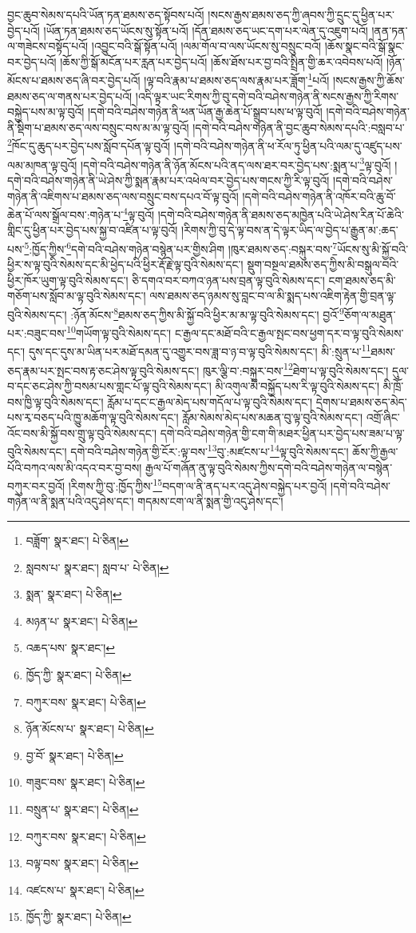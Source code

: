 བྱང་ཆུབ་སེམས་དཔའི་ཡོན་ཏན་ཐམས་ཅད་སྟོབས་པའོ། །སངས་རྒྱས་ཐམས་ཅད་ཀྱི་ཞབས་ཀྱི་དྲུང་དུ་ཕྱིན་པར་བྱེད་པའོ། །ཡོན་ཏན་ཐམས་ཅད་ཡོངས་སུ་སྟོན་པའོ། །དོན་ཐམས་ཅད་ཡང་དག་པར་ལེན་དུ་འཇུག་པའོ། །ནན་ཏན་ལ་གཟེངས་བསྟོད་པའོ། །འབྱུང་བའི་སྒོ་སྟོན་པའོ། །ལམ་གོལ་བ་ལས་ཡོངས་སུ་བསྲུང་བའོ། །ཆོས་སྣང་བའི་སྒོ་སྣང་བར་བྱེད་པའོ། །ཆོས་ཀྱི་སྒོ་མངོན་པར་རླན་པར་བྱེད་པའོ། །ཆོས་ཐོས་པར་བྱ་བའི་སྤྲིན་གྱི་ཆར་འབེབས་པའོ། །ཉོན་མོངས་པ་ཐམས་ཅད་ཞི་བར་བྱེད་པའོ། །ལྟ་བའི་རྣམ་པ་ཐམས་ཅད་ལས་རྣམ་པར་ཟློག་\footnote{བཟློག་  སྣར་ཐང་།  པེ་ཅིན། }པའོ། །སངས་རྒྱས་ཀྱི་ཆོས་ཐམས་ཅད་ལ་གནས་པར་བྱེད་པའོ། །འདི་ལྟར་ཡང་རིགས་ཀྱི་བུ་དགེ་བའི་བཤེས་གཉེན་ནི་སངས་རྒྱས་ཀྱི་རིགས་བསྐྱེད་པས་མ་ལྟ་བུའོ། །དགེ་བའི་བཤེས་གཉེན་ནི་ཕན་ཡོན་རྒྱ་ཆེན་པོ་སྒྲུབ་པས་ཕ་ལྟ་བུའོ། །དགེ་བའི་བཤེས་གཉེན་ནི་སྡིག་པ་ཐམས་ཅད་ལས་བསྲུང་བས་མ་མ་ལྟ་བུའོ། །དགེ་བའི་བཤེས་གཉེན་ནི་བྱང་ཆུབ་སེམས་དཔའི་:བསླབ་པ་\footnote{སླབས་པ་  སྣར་ཐང་། སླབ་པ་  པེ་ཅིན། }ཁོང་དུ་ཆུད་པར་བྱེད་པས་སློབ་དཔོན་ལྟ་བུའོ། །དགེ་བའི་བཤེས་གཉེན་ནི་ཕ་རོལ་ཏུ་ཕྱིན་པའི་ལམ་དུ་འཛུད་པས་ལམ་མཁན་ལྟ་བུའོ། །དགེ་བའི་བཤེས་གཉེན་ནི་ཉོན་མོངས་པའི་ནད་ལས་ཐར་བར་བྱེད་པས་:སྨན་པ་\footnote{སྨན་  སྣར་ཐང་།  པེ་ཅིན། }ལྟ་བུའོ། །དགེ་བའི་བཤེས་གཉེན་ནི་ཡེ་ཤེས་ཀྱི་སྨན་རྣམ་པར་འཕེལ་བར་བྱེད་པས་གངས་ཀྱི་རི་ལྟ་བུའོ། །དགེ་བའི་བཤེས་གཉེན་ནི་འཇིགས་པ་ཐམས་ཅད་ལས་བསྲུང་བས་དཔའ་བོ་ལྟ་བུའོ། །དགེ་བའི་བཤེས་གཉེན་ནི་འཁོར་བའི་ཆུ་བོ་ཆེན་པོ་ལས་སྒྲོལ་བས་:གཉེན་པ་\footnote{མཉན་པ་  སྣར་ཐང་།  པེ་ཅིན། }ལྟ་བུའོ། །དགེ་བའི་བཤེས་གཉེན་ནི་ཐམས་ཅད་མཁྱེན་པའི་ཡེ་ཤེས་རིན་པོ་ཆེའི་གླིང་དུ་ཕྱིན་པར་བྱེད་པས་སྐྱ་བ་འཛིན་པ་ལྟ་བུའོ། །རིགས་ཀྱི་བུ་དེ་ལྟ་བས་ན་དེ་ལྟར་ཡིད་ལ་བྱེད་པ་རྒྱུན་མ་:ཆད་པས་\footnote{འཆད་པས་  སྣར་ཐང་། }:ཁྱོད་ཀྱིས་\footnote{ཁྱོད་ཀྱི་  སྣར་ཐང་།  པེ་ཅིན། }དགེ་བའི་བཤེས་གཉེན་བསྙེན་པར་གྱིས་ཤིག །ཁུར་ཐམས་ཅད་:བསྐུར་བས་\footnote{བཀུར་བས་  སྣར་ཐང་།  པེ་ཅིན། }ཡོངས་སུ་མི་སྐྱོ་བའི་ཕྱིར་ས་ལྟ་བུའི་སེམས་དང་མི་ཕྱེད་པའི་ཕྱིར་རྡོ་རྗེ་ལྟ་བུའི་སེམས་དང་། སྡུག་བསྔལ་ཐམས་ཅད་ཀྱིས་མི་བསྒུལ་བའི་ཕྱིར་ཁོར་ཡུག་ལྟ་བུའི་སེམས་དང་། ཅི་དགའ་བར་བཀའ་ཉན་པས་བྲན་ལྟ་བུའི་སེམས་དང་། ངག་ཐམས་ཅད་མི་གཅོག་པས་སློབ་མ་ལྟ་བུའི་སེམས་དང་། ལས་ཐམས་ཅད་ཉམས་སུ་བླང་བ་ལ་མི་སྨད་པས་འཇིག་རྟེན་གྱི་བྲན་ལྟ་བུའི་སེམས་དང་། :ཉོན་མོངས་\footnote{ཉོན་མོངས་པ་  སྣར་ཐང་།  པེ་ཅིན། }ཐམས་ཅད་ཀྱིས་མི་སྐྱོ་བའི་ཕྱིར་མ་མ་ལྟ་བུའི་སེམས་དང་། བྱའོ་\footnote{བྱ་བོ་  སྣར་ཐང་།  པེ་ཅིན། }ཅོག་ལ་མཐུན་པར་:བཟུང་བས་\footnote{གཟུང་བས་  སྣར་ཐང་།  པེ་ཅིན། }གཡོག་ལྟ་བུའི་སེམས་དང་། ང་རྒྱལ་དང་མཐོ་བའི་ང་རྒྱལ་སྤང་བས་ཕྱག་དར་བ་ལྟ་བུའི་སེམས་དང་། དུས་དང་དུས་མ་ཡིན་པར་མཐོ་དམན་དུ་འགྱུར་བས་ཟླ་བ་ཉ་བ་ལྟ་བུའི་སེམས་དང་། མི་:སྲུན་པ་\footnote{བསྲུན་པ་  སྣར་ཐང་།  པེ་ཅིན། }ཐམས་ཅད་རྣམ་པར་སྤང་བས་རྟ་ཅང་ཤེས་ལྟ་བུའི་སེམས་དང་། ཁུར་ལྕི་བ་:བསྐུར་བས་\footnote{བཀུར་བས་  སྣར་ཐང་།  པེ་ཅིན། }ཐེག་པ་ལྟ་བུའི་སེམས་དང་། དུལ་བ་དང་ཅང་ཤེས་ཀྱི་བསམ་པས་གླང་པོ་ལྟ་བུའི་སེམས་དང་། མི་འགུལ་མི་བསྐྱོད་པས་རི་ལྟ་བུའི་སེམས་དང་། མི་ཁྲོ་བས་ཁྱི་ལྟ་བུའི་སེམས་དང་། རློམ་པ་དང་ང་རྒྱལ་མེད་པས་གདོལ་པ་ལྟ་བུའི་སེམས་དང་། དྲེགས་པ་ཐམས་ཅད་མེད་པས་རྭ་བཅད་པའི་ཁྱུ་མཆོག་ལྟ་བུའི་སེམས་དང་། རློམ་སེམས་མེད་པས་མཆན་བུ་ལྟ་བུའི་སེམས་དང་། འགྲོ་ཞིང་འོང་བས་མི་སྐྱོ་བས་གྲུ་ལྟ་བུའི་སེམས་དང་། དགེ་བའི་བཤེས་གཉེན་གྱི་ངག་གི་མཐར་ཕྱིན་པར་བྱེད་པས་ཟམ་པ་ལྟ་བུའི་སེམས་དང་། དགེ་བའི་བཤེས་གཉེན་གྱི་ངོར་:ལྟ་བས་\footnote{བལྟ་བས་  སྣར་ཐང་།  པེ་ཅིན། }བུ་:མཛངས་པ་\footnote{འཛངས་པ་  སྣར་ཐང་།  པེ་ཅིན། }ལྟ་བུའི་སེམས་དང་། ཆོས་ཀྱི་རྒྱལ་པོའི་བཀའ་ལས་མི་འདའ་བར་བྱ་བས། རྒྱལ་པོ་གཞོན་ནུ་ལྟ་བུའི་སེམས་ཀྱིས་དགེ་བའི་བཤེས་གཉེན་ལ་བསྙེན་བཀུར་བར་བྱའོ། །རིགས་ཀྱི་བུ་:ཁྱོད་ཀྱིས་\footnote{ཁྱོད་ཀྱི་  སྣར་ཐང་།  པེ་ཅིན། }བདག་ལ་ནི་ནད་པར་འདུ་ཤེས་བསྐྱེད་པར་བྱའོ། །དགེ་བའི་བཤེས་གཉེན་ལ་ནི་སྨན་པའི་འདུ་ཤེས་དང་། གདམས་ངག་ལ་ནི་སྨན་གྱི་འདུ་ཤེས་དང་། 